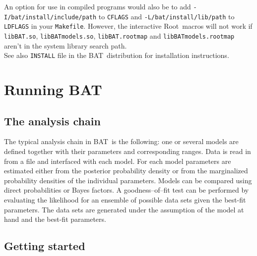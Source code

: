 \documentclass[11pt, a4paper]{article}
\newcommand{\bat}{{\sc BAT}}
\newcommand{\Root}{{\sc Root}}
\begin{document}
\noindent
An option for use in compiled programs would also be to add
\verb|-I/bat/install/include/path| to \verb|CFLAGS| and
\verb|-L/bat/install/lib/path| to \verb|LDFLAGS| in your
\verb|Makefile|. However, the interactive \Root\ macros will not work if
\verb|libBAT.so|, \verb|libBATmodels.so|, \verb|libBAT.rootmap| and
\verb|libBATmodels.rootmap| aren't in the system library search path. \\

\noindent
See also \verb|INSTALL| file in the \bat\ distribution for installation instructions.



\section{Running \bat}
\label{section:running}

\subsection{The analysis chain}
\label{subsection:chain}

The typical analysis chain in \bat\ is the following: one or several
models are defined together with their parameters and corresponding
ranges. Data is read in from a file and interfaced with each
model. For each model parameters are estimated either from the
posterior probability density or from the marginalized probability
densities of the individual parameters. Models can be compared using
direct probabilities or Bayes factors. A goodness--of--fit test can be
performed by evaluating the likelihood for an ensemble of possible
data sets given the best-fit parameters. The data sets are generated
under the assumption of the model at hand and the best-fit
parameters. \\


\subsection{Getting started}
\label{subsection:start}
\end{document}
